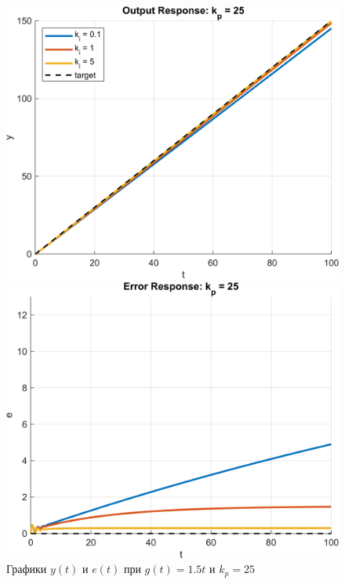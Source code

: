 \begin{figure}[H]
    \centering
    \begin{minipage}{0.45\textwidth}
        \centering
        \includegraphics[width=1\textwidth, trim={1cm 0cm 1cm 0cm}]{../images/input_2_kp_25_output.png}
    \end{minipage}
    \hfill
    \begin{minipage}{0.45\textwidth}
        \centering
        \includegraphics[width=1\textwidth, trim={1cm 0cm 1cm 0cm}]{../images/input_2_kp_25_error.png}
    \end{minipage}
    \caption{Графики $y(t)$ и $e(t)$ при $g(t) = 1.5t$ и $k_p = 25$}
\end{figure}

